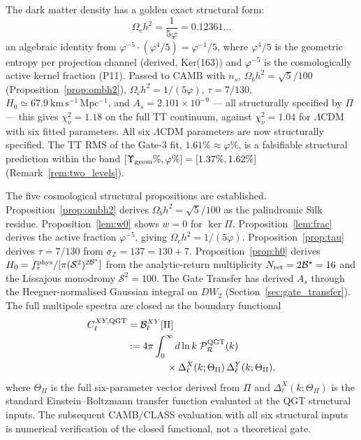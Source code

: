 \documentclass[twocolumn,10pt]{article}
\newcommand{\vp}{\varphi}
\newcommand{\kerPi}{\ker\Pi}
\begin{document}
The dark matter density has a golden exact structural form:
\begin{equation*}
  \Omega_ch^2 = \frac{1}{5\vp} = 0.12361\ldots
\end{equation*}
an algebraic identity from $\vp^{-5}\cdot(\vp^4/5)=\vp^{-1}/5$, where
$\vp^4/5$ is the geometric entropy per projection channel (derived,
Ker(163)) and $\vp^{-5}$ is the cosmologically active kernel fraction
(P11). Passed to CAMB with $n_s$, $\Omega_bh^2=\sqrt{5}/100$
(Proposition~\ref{prop:ombh2}),
$\Omega_ch^2=1/(5\vp)$, $\tau=7/130$,
$H_0\simeq67.9~\mathrm{km\,s^{-1}\,Mpc^{-1}}$, and
$A_s=2.101\times10^{-9}$ — all structurally specified by $\Pi$ —
this gives $\chi^2_\nu=1.18$ on the full TT continuum,
against $\chi^2_\nu=1.04$ for $\Lambda$CDM with six fitted parameters.
All six $\Lambda$CDM parameters are now structurally specified.
The TT RMS of the Gate-3 fit, $1.61\%\approx\vp\%$,
is a falsifiable structural prediction within the band
$[\Upsilon_{\rm geom}\%,\vp\%]=[1.37\%,1.62\%]$
(Remark~\ref{rem:two_levels}).

The five cosmological structural propositions are established.
Proposition~\ref{prop:ombh2} derives $\Omega_bh^2=\sqrt{5}/100$
as the palindromic Silk residue.
Proposition~\ref{lem:w0} shows $w=0$ for $\kerPi$.
Proposition~\ref{lem:frac} derives the active fraction $\vp^{-5}$,
giving $\Omega_ch^2=1/(5\vp)$.
Proposition~\ref{prop:tau} derives $\tau=7/130$ from $\sigma_{\mathbb{Z}}=137=130+7$.
Proposition~\ref{prop:h0} derives $H_0=f_\tau^{\rm phys}/[\pi(\mathcal{S}^2)^{2\mathcal{B}^\star}]$
from the analytic-return multiplicity $N_{\rm ret}=2\mathcal{B}^\star=16$ and the
Lissajous monodromy $\mathcal{S}^2=100$.
The Gate Transfer has derived $A_s$ through the Heegner-normalised
Gaussian integral on $DW_2$ (Section~\ref{sec:gate_transfer}).
The full multipole spectra are closed as the boundary functional
\begin{align}
  C_\ell^{XY,{\rm QGT}}
  &= \mathcal{B}_\ell^{XY}[\Pi] \notag\\
  &:= 4\pi\int_0^\infty d\ln k\;
  \mathcal{P}_{\mathcal{R}}^{\rm QGT}(k)\notag\\
  &\hspace{4em}\times
  \Delta_\ell^X(k;\Theta_\Pi)\,\Delta_\ell^Y(k;\Theta_\Pi),
  \label{eq:Cl_boundary}
\end{align}
where $\Theta_\Pi$ is the full six-parameter vector derived from $\Pi$
and $\Delta_\ell^{X}(k;\Theta_\Pi)$ is the standard Einstein--Boltzmann
transfer function evaluated at the QGT structural inputs.
The subsequent CAMB/CLASS evaluation with all six structural inputs
is numerical verification of the closed functional, not a theoretical gate.
\end{document}
